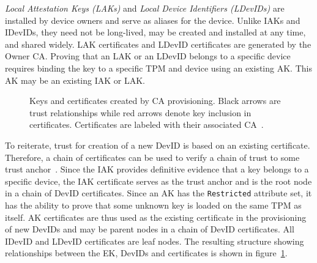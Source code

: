 \documentclass[runningheads]{llncs}
\begin{document}
\emph{Local Attestation Keys (LAKs)} and 
\emph{Local Device Identifiers (LDevIDs)} are installed by device owners
and serve as aliases for the device. Unlike IAKs and IDevIDs, they
need not be long-lived, may be created and installed at any time, and
shared widely. LAK certificates and LDevID certificates are generated by
the Owner CA. Proving that an LAK or an LDevID belongs to a specific device 
requires binding the key to a specific TPM and device using an existing AK. 
This AK may be an existing IAK or LAK. 





\begin{figure}[hbtp]
  \centering
  
  \caption{Keys and certificates created by CA provisioning.
    Black arrows are trust relationships while red
    arrows denote key inclusion in certificates. Certificates are
    labeled with their associated CA~\citep{DevIDSpec-TCG}.}
  \label{fig:cert_rel}
\end{figure}

To reiterate, trust for creation of a new DevID is based on an existing 
certificate. Therefore, a chain of certificates can be used to verify 
a chain of trust to some trust anchor~\citep{DevIDSpec-TCG}.
Since the IAK provides definitive evidence that a key belongs to a 
specific device, the IAK certificate serves as the trust anchor 
and is the root node in a chain of DevID certificates. Since an AK has 
the \verb|Restricted| attribute set, it has the ability to prove that 
some unknown key is loaded on the same TPM as itself.  AK certificates 
are thus used as the existing certificate in the provisioning of new DevIDs
and may be parent nodes in a chain of DevID certificates. 
All IDevID and LDevID certificates are leaf nodes.
The resulting structure showing relationships between the EK, DevIDs 
and certificates is shown in figure~\ref{fig:cert_rel}.
\end{document}
